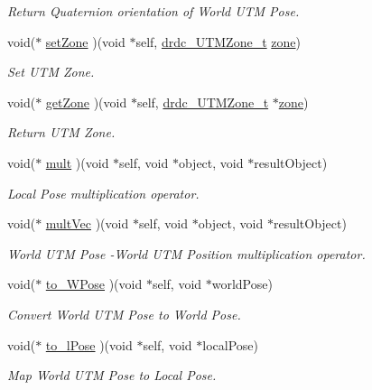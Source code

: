 \begin{CompactItemize}
\begin{CompactList}\small\item\em Return Quaternion orientation of World UTM Pose. \item\end{CompactList}\item 
void($\ast$ \hyperlink{structdrdc__WUTMPose__t_03c3cce9de57689df2b2d2e777812947}{setZone} )(void $\ast$self, \hyperlink{structdrdc__UTMZone__t}{drdc\_\-UTMZone\_\-t} \hyperlink{structdrdc__WUTMPose__t_a503d72607bcdbfd06eee395170ea3a3}{zone})
\begin{CompactList}\small\item\em Set UTM Zone. \item\end{CompactList}\item 
void($\ast$ \hyperlink{structdrdc__WUTMPose__t_5834f1f0fff3d88d7adc68ec6d672be8}{getZone} )(void $\ast$self, \hyperlink{structdrdc__UTMZone__t}{drdc\_\-UTMZone\_\-t} $\ast$\hyperlink{structdrdc__WUTMPose__t_a503d72607bcdbfd06eee395170ea3a3}{zone})
\begin{CompactList}\small\item\em Return UTM Zone. \item\end{CompactList}\item 
void($\ast$ \hyperlink{structdrdc__WUTMPose__t_fda321bcdefbdfe5ccaa22d1559c881a}{mult} )(void $\ast$self, void $\ast$object, void $\ast$resultObject)
\begin{CompactList}\small\item\em Local Pose multiplication operator. \item\end{CompactList}\item 
void($\ast$ \hyperlink{structdrdc__WUTMPose__t_bcb964a242740df7a4c6dfe56a699d77}{multVec} )(void $\ast$self, void $\ast$object, void $\ast$resultObject)
\begin{CompactList}\small\item\em World UTM Pose -World UTM Position multiplication operator. \item\end{CompactList}\item 
void($\ast$ \hyperlink{structdrdc__WUTMPose__t_7fa7adff22c3abf23af792371033c05a}{to\_\-WPose} )(void $\ast$self, void $\ast$worldPose)
\begin{CompactList}\small\item\em Convert World UTM Pose to World Pose. \item\end{CompactList}\item 
void($\ast$ \hyperlink{structdrdc__WUTMPose__t_5cd9771a71e52c7c7e6f26820019e449}{to\_\-lPose} )(void $\ast$self, void $\ast$localPose)
\begin{CompactList}\small\item\em Map World UTM Pose to Local Pose. \item\end{CompactList}\end{CompactItemize}


